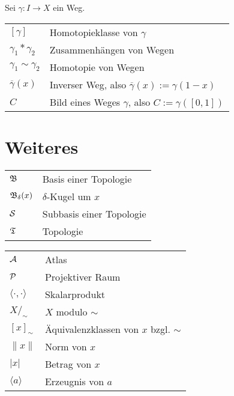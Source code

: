 Sei $\gamma: I \rightarrow X$ ein Weg.

\settowidth{}
\setlength\mylengthb{\dimexpr\columnwidth-\mylengtha-2\tabcolsep\relax}

\begin{xtabular}{@{} p{\mylengtha} P{\mylengthb} @{}}
$[\gamma]$               & Homotopieklasse von $\gamma$\\
$\gamma_1 * \gamma_2$    & Zusammenhängen von Wegen\\
$\gamma_1 \sim \gamma_2$ & Homotopie von Wegen\\
$\overline{\gamma}(x)$   & Inverser Weg, also $\overline{\gamma}(x) := \gamma(1-x)$\\
$C$                      & Bild eines Weges $\gamma$, also $C := \gamma([0,1])$
\end{xtabular}
\section*{Weiteres}

\settowidth{}
\setlength\mylengthb{\dimexpr\columnwidth-\mylengtha-2\tabcolsep\relax}

\begin{xtabular}{@{} p{\mylengtha} P{\mylengthb} @{}}
$\mathfrak{B}$          & Basis einer Topologie\\
$\mathfrak{B}_\delta(x)$& $\delta$-Kugel um $x$\\
$\mathcal{S}$        & Subbasis einer Topologie\\
$\mathfrak{T}$          & Topologie\\
\end{xtabular}

\settowidth{}
\setlength\mylengthb{\dimexpr\columnwidth-\mylengtha-2\tabcolsep\relax}

\begin{xtabular}{@{} p{\mylengtha} P{\mylengthb} @{}}
$\mathcal{A}$                        & Atlas\\
$\mathcal{P}$                        & Projektiver Raum\\
$\langle \cdot , \cdot \rangle$ & Skalarprodukt\\
$X /_\sim$                      & $X$ modulo $\sim$\\
$[x]_\sim$                      & Äquivalenzklassen von $x$ bzgl. $\sim$\\
$\| x \|$                       & Norm von $x$\\
$| x |$                         & Betrag von $x$\\
$\langle a \rangle$             & Erzeugnis von $a$\\
\end{xtabular}

